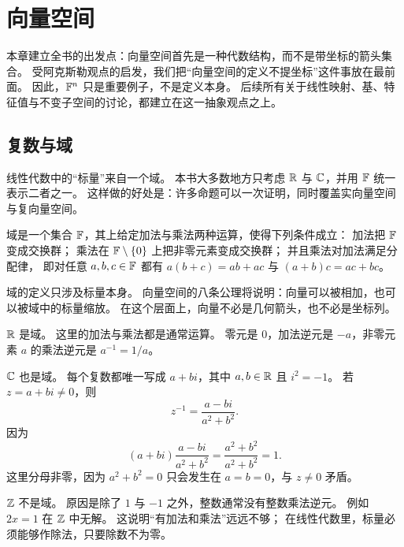 \chapter{向量空间}

本章建立全书的出发点：向量空间首先是一种代数结构，而不是带坐标的箭头集合。 受阿克斯勒观点的启发，我们把“向量空间的定义不提坐标”这件事放在最前面。
因此，$\mathbb{F}^n$ 只是重要例子，不是定义本身。 后续所有关于线性映射、基、特征值与不变子空间的讨论，都建立在这一抽象观点之上。

\section{复数与域}

线性代数中的“标量”来自一个域。 本书大多数地方只考虑 $\mathbb{R}$ 与 $\mathbb{C}$，并用 $\mathbb{F}$ 统一表示二者之一。
这样做的好处是：许多命题可以一次证明，同时覆盖实向量空间与复向量空间。

\begin{definition} 域是一个集合 $\mathbb{F}$，其上给定加法与乘法两种运算，使得下列条件成立：
加法把 $\mathbb{F}$ 变成交换群； 乘法在 $\mathbb{F}\setminus\{0\}$ 上把非零元素变成交换群；
并且乘法对加法满足分配律， 即对任意 $a,b,c\in\mathbb{F}$ 都有 $a(b+c)=ab+ac$ 与 $(a+b)c=ac+bc$。
\end{definition}

\begin{remark} 域的定义只涉及标量本身。
向量空间的八条公理将说明：向量可以被相加，也可以被域中的标量缩放。 在这个层面上，向量不必是几何箭头，也不必是坐标列。
\end{remark}

\begin{example} $\mathbb{R}$ 是域。
这里的加法与乘法都是通常运算。 零元是 $0$，加法逆元是 $-a$，非零元素 $a$ 的乘法逆元是 $a^{-1}=1/a$。
\end{example}

\begin{example} $\mathbb{C}$ 也是域。
每个复数都唯一写成 $a+bi$，其中 $a,b\in\mathbb{R}$ 且 $i^2=-1$。 若 $z=a+bi\neq 0$，则
\[ z^{-1}=\frac{a-bi}{a^2+b^2}.
\] 因为
\[ (a+bi)\frac{a-bi}{a^2+b^2}=\frac{a^2+b^2}{a^2+b^2}=1.
\] 这里分母非零，因为 $a^2+b^2=0$ 只会发生在 $a=b=0$，与 $z\neq 0$ 矛盾。
\end{example}

\begin{example} $\mathbb{Z}$ 不是域。
原因是除了 $1$ 与 $-1$ 之外，整数通常没有整数乘法逆元。 例如 $2x=1$ 在 $\mathbb{Z}$ 中无解。
这说明“有加法和乘法”远远不够； 在线性代数里，标量必须能够作除法，只要除数不为零。
\end{example}

